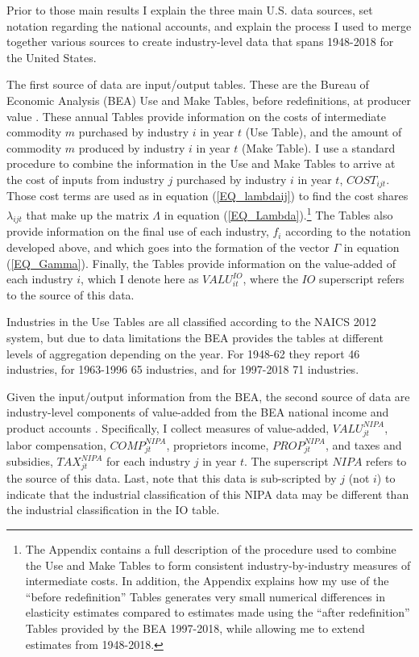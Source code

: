 \documentclass[11pt]{article}
\begin{document}
Prior to those main results I explain the three main U.S. data sources, set notation regarding the national accounts, and explain the process I used to merge together various sources to create industry-level data that spans 1948-2018 for the United States.

The first source of data are input/output tables. These are the Bureau of Economic Analysis (BEA) Use and Make Tables, before redefinitions, at producer value \citep{beaio}. These annual Tables provide information on the costs of intermediate commodity $m$ purchased by industry $i$ in year $t$ (Use Table), and the amount of commodity $m$ produced by industry $i$ in year $t$ (Make Table). I use a standard procedure to combine the information in the Use and Make Tables to arrive at the cost of inputs from industry $j$ purchased by industry $i$ in year $t$, $COST_{ijt}$. Those cost terms are used as in equation (\ref{EQ_lambdaij}) to find the cost shares $\lambda_{ijt}$ that make up the matrix $\Lambda$ in equation (\ref{EQ_Lambda}).\footnote{The Appendix contains a full description of the procedure used to combine the Use and Make Tables to form consistent industry-by-industry measures of intermediate costs. In addition, the Appendix explains how my use of the ``before redefinition'' Tables generates very small numerical differences in elasticity estimates compared to estimates made using the ``after redefinition'' Tables provided by the BEA 1997-2018, while allowing me to extend estimates from 1948-2018.} The Tables also provide information on the final use of each industry, $f_i$ according to the notation developed above, and which goes into the formation of the vector $\Gamma$ in equation (\ref{EQ_Gamma}). Finally, the Tables provide information on the value-added of each industry $i$, which I denote here as $VALU_{it}^{IO}$, where the $IO$ superscript refers to the source of this data.

Industries in the Use Tables are all classified according to the NAICS 2012 system, but due to data limitations the BEA provides the tables at different levels of aggregation depending on the year. For 1948-62 they report 46 industries, for 1963-1996 65 industries, and for 1997-2018 71 industries. 

Given the input/output information from the BEA, the second source of data are industry-level components of value-added from the BEA national income and product accounts \citep{beasection6,beahistind}. Specifically, I collect measures of value-added, $VALU_{jt}^{NIPA}$, labor compensation, $COMP_{jt}^{NIPA}$, proprietors income, $PROP_{jt}^{NIPA}$, and taxes and subsidies, $TAX_{jt}^{NIPA}$ for each industry $j$ in year $t$. The superscript $NIPA$ refers to the source of this data. Last, note that this data is sub-scripted by $j$ (not $i$) to indicate that the industrial classification of this NIPA data may be different than the industrial classification in the IO table.
\end{document}
